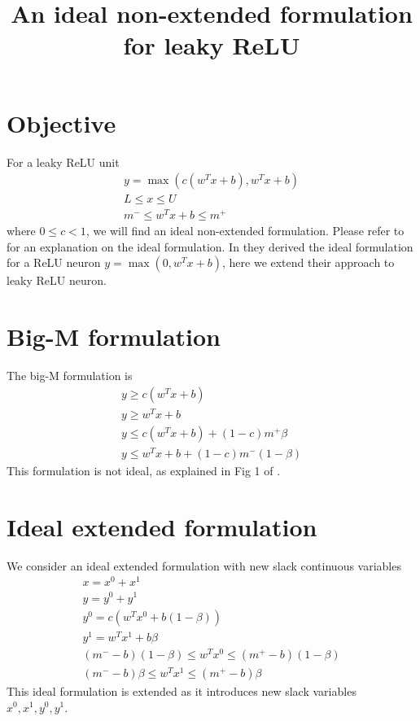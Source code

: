 \documentclass{article}
\title{An ideal non-extended formulation for leaky ReLU}
\begin{document}
\maketitle
\section{Objective}
For a leaky ReLU unit
\begin{subequations}
\begin{align}
	y = \max(c(w^Tx+b), w^Tx+b)\\
	L \le x \le U\\
	m^- \le w^Tx + b \le m^+
\end{align}
\end{subequations}
where $0\le c < 1$, we will find an ideal non-extended formulation. Please refer to \cite{Anderson2020} for an explanation on the ideal formulation. In \cite{Anderson2020} they derived the ideal formulation for a ReLU neuron $y = \max(0, w^Tx+b)$, here we extend their approach to leaky ReLU neuron.

\section{Big-M formulation}
The big-M formulation is
\begin{subequations}
\begin{align}
	y \ge c(w^Tx+b)\\
	y \ge w^Tx+b\\
    y \le c(w^Tx+b) + (1-c)m^+\beta\\
    y \le w^Tx+b + (1-c)m^-(1-\beta)
\end{align}
\end{subequations}
This formulation is not ideal, as explained in Fig 1 of \cite{Anderson2020}.

\section{Ideal extended formulation}
We consider an ideal extended formulation with new slack continuous variables
\begin{subequations}
\begin{align}
	x = x^0 + x^1\\
	y = y^0 + y^1\\
	y^0 = c(w^Tx^0 + b(1-\beta))\\
	y^1 = w^Tx^1 + b\beta\\
	(m^--b)(1-\beta) \le w^Tx^0\le(m^+-b)(1-\beta)\\
	(m^--b)\beta \le w^Tx^1\le(m^+-b)\beta
\end{align}
\end{subequations}
This ideal formulation is extended as it introduces new slack variables $x^0, x^1, y^0, y^1$.
\end{document}
